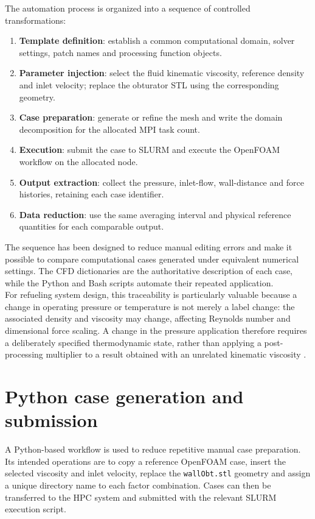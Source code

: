 The automation process is organized into a sequence of controlled transformations:
\begin{enumerate}
\item \textbf{Template definition}: establish a common computational domain, solver settings, patch names and processing function objects.
\item \textbf{Parameter injection}: select the fluid kinematic viscosity, reference density and inlet velocity; replace the obturator STL using the corresponding geometry.
\item \textbf{Case preparation}: generate or refine the mesh and write the domain decomposition for the allocated MPI task count.
\item \textbf{Execution}: submit the case to SLURM and execute the OpenFOAM workflow on the allocated node.
\item \textbf{Output extraction}: collect the pressure, inlet-flow, wall-distance and force histories, retaining each case identifier.
\item \textbf{Data reduction}: use the same averaging interval and physical reference quantities for each comparable output.
\end{enumerate}
The sequence has been designed to reduce manual editing errors and make it possible to compare computational cases generated under equivalent numerical settings. The CFD dictionaries are the authoritative description of each case, while the Python and Bash scripts automate their repeated application.\\

For refueling system design, this traceability is particularly valuable because a change in operating pressure or temperature is not merely a label change: the associated density and viscosity may change, affecting Reynolds number and dimensional force scaling. A change in the pressure application therefore requires a deliberately specified thermodynamic state, rather than applying a post-processing multiplier to a result obtained with an unrelated kinematic viscosity \cite{nist_refprop,white2016}.

\section{Python case generation and submission}
\label{sec:python_doe_generator}

A Python-based workflow is used to reduce repetitive manual case preparation. Its intended operations are to copy a reference OpenFOAM case, insert the selected viscosity and inlet velocity, replace the \texttt{wallObt.stl} geometry and assign a unique directory name to each factor combination. Cases can then be transferred to the HPC system and submitted with the relevant SLURM execution script.

